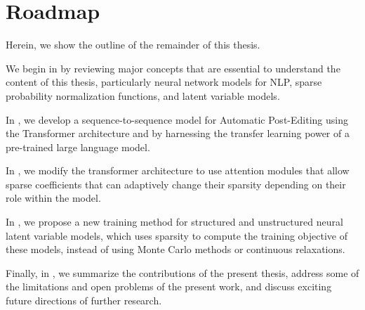 \section{Roadmap}
\label{sec:int_roadmap}

\noindent Herein, we show the outline of the remainder of this thesis.

We begin in  by reviewing major concepts
that are essential to understand the content of this thesis,
particularly neural network models for NLP, sparse probability
normalization functions, and latent variable models.

In , we develop a sequence-to-sequence model for
Automatic Post-Editing using the Transformer architecture and by
harnessing the transfer learning power of a pre-trained large
language model.

In , we modify the transformer architecture to use
attention modules that allow sparse coefficients that can adaptively
change their sparsity depending on their role within the model.

In , we propose a new training method for
structured and unstructured neural latent variable models, which uses
sparsity to compute the training objective of these
models, instead of using Monte Carlo methods or continuous relaxations.

Finally, in , we summarize the
contributions of the present thesis, address some of the limitations
and open problems of the present work, and discuss exciting future
directions of further research.
